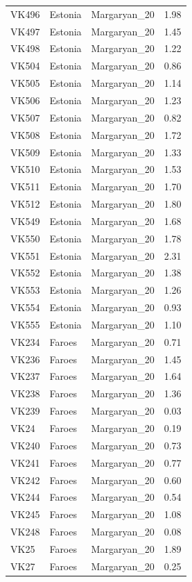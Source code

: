 \begin{longtable}[t]{lllr}
VK496 & Estonia & Margaryan\_20 & 1.98\\
VK497 & Estonia & Margaryan\_20 & 1.45\\
VK498 & Estonia & Margaryan\_20 & 1.22\\
VK504 & Estonia & Margaryan\_20 & 0.86\\
VK505 & Estonia & Margaryan\_20 & 1.14\\
VK506 & Estonia & Margaryan\_20 & 1.23\\
VK507 & Estonia & Margaryan\_20 & 0.82\\
VK508 & Estonia & Margaryan\_20 & 1.72\\
VK509 & Estonia & Margaryan\_20 & 1.33\\
VK510 & Estonia & Margaryan\_20 & 1.53\\
VK511 & Estonia & Margaryan\_20 & 1.70\\
VK512 & Estonia & Margaryan\_20 & 1.80\\
VK549 & Estonia & Margaryan\_20 & 1.68\\
VK550 & Estonia & Margaryan\_20 & 1.78\\
VK551 & Estonia & Margaryan\_20 & 2.31\\
VK552 & Estonia & Margaryan\_20 & 1.38\\
VK553 & Estonia & Margaryan\_20 & 1.26\\
VK554 & Estonia & Margaryan\_20 & 0.93\\
VK555 & Estonia & Margaryan\_20 & 1.10\\
VK234 & Faroes & Margaryan\_20 & 0.71\\
VK236 & Faroes & Margaryan\_20 & 1.45\\
VK237 & Faroes & Margaryan\_20 & 1.64\\
VK238 & Faroes & Margaryan\_20 & 1.36\\
VK239 & Faroes & Margaryan\_20 & 0.03\\
VK24 & Faroes & Margaryan\_20 & 0.19\\
VK240 & Faroes & Margaryan\_20 & 0.73\\
VK241 & Faroes & Margaryan\_20 & 0.77\\
VK242 & Faroes & Margaryan\_20 & 0.60\\
VK244 & Faroes & Margaryan\_20 & 0.54\\
VK245 & Faroes & Margaryan\_20 & 1.08\\
VK248 & Faroes & Margaryan\_20 & 0.08\\
VK25 & Faroes & Margaryan\_20 & 1.89\\
VK27 & Faroes & Margaryan\_20 & 0.25\\

\end{longtable}
